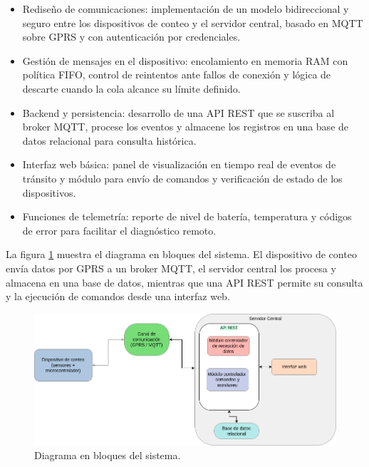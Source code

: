 \begin{itemize}

\item Rediseño de comunicaciones: implementación de un modelo bidireccional y seguro entre los dispositivos de conteo y el servidor central, basado en MQTT sobre GPRS y con autenticación por credenciales.

\item Gestión de mensajes en el dispositivo: encolamiento en memoria RAM con política FIFO, control de reintentos ante fallos de conexión y lógica de descarte cuando la cola alcance su límite definido.

\item Backend y persistencia: desarrollo de una API REST que se suscriba al broker MQTT, procese los eventos y almacene los registros en una base de datos relacional para consulta histórica.

\item Interfaz web básica: panel de visualización en tiempo real de eventos de tránsito y módulo para envío de comandos y verificación de estado de los dispositivos.

\item Funciones de telemetría: reporte de nivel de batería, temperatura y códigos de error para facilitar el diagnóstico remoto.

\end{itemize}

La figura \ref{fig:diag_bloques} muestra el diagrama en bloques del sistema. 
El dispositivo de conteo envía datos por GPRS a un broker MQTT, el servidor central 
los procesa y almacena en una base de datos, mientras que una API REST permite su 
consulta y la ejecución de comandos desde una interfaz web.

\vspace{1cm}

\begin{figure}[htbp]
  \centering
  \includegraphics[width=\linewidth]{./Figures/diagBloques.png}
  \caption{Diagrama en bloques del sistema.}
  \label{fig:diag_bloques}
\end{figure}

\vspace{1cm}











